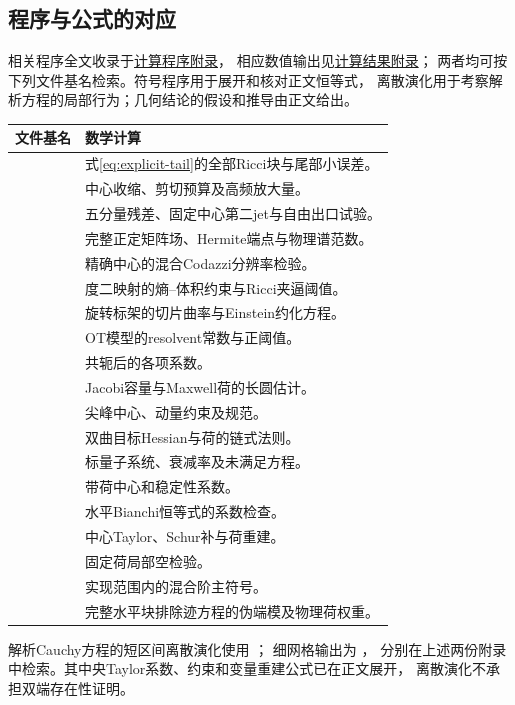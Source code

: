 \documentclass[UTF8,a4paper,11pt,fontset=fandol]{ctexart}
\numberwithin{equation}{section}
\theoremstyle{definition}
\begin{document}
\subsection{程序与公式的对应}
相关程序全文收录于\href{../references/computations.md}{计算程序附录}，
相应数值输出见\href{../references/experiments.md}{计算结果附录}；
两者均可按下列文件基名检索。符号程序用于展开和核对正文恒等式，
离散演化用于考察解析方程的局部行为；几何结论的假设和推导由正文给出。
\begin{longtable}{L{.57\textwidth}L{.31\textwidth}}
\toprule 文件基名 & 数学计算\\\midrule\endhead
{} & 式\eqref{eq:explicit-tail}的全部Ricci块与尾部小误差。\\
 & 中心收缩、剪切预算及高频放大量。\\
 & 五分量残差、固定中心第二jet与自由出口试验。\\
 & 完整正定矩阵场、Hermite端点与物理谱范数。\\
 & 精确中心的混合Codazzi分辨率检验。\\
 & 度二映射的熵--体积约束与Ricci夹逼阈值。\\
 & 旋转标架的切片曲率与Einstein约化方程。\\
 & OT模型的resolvent常数与正阈值。\\
 & 共轭后的各项系数。\\
 & Jacobi容量与Maxwell荷的长圆估计。\\
 & 尖峰中心、动量约束及规范。\\
 & 双曲目标Hessian与荷的链式法则。\\
 & 标量子系统、衰减率及未满足方程。\\
 & 带荷中心和稳定性系数。\\
 & 水平Bianchi恒等式的系数检查。\\
 & 中心Taylor、Schur补与荷重建。\\
 & 固定荷局部空检验。\\
 & 实现范围内的混合阶主符号。\\
 & 完整水平块排除迹方程的伪端模及物理荷权重。\\\bottomrule
\end{longtable}
解析Cauchy方程的短区间离散演化使用
；
细网格输出为
，
分别在上述两份附录中检索。其中央Taylor系数、约束和变量重建公式已在正文展开，
离散演化不承担双端存在性证明。
\end{document}
